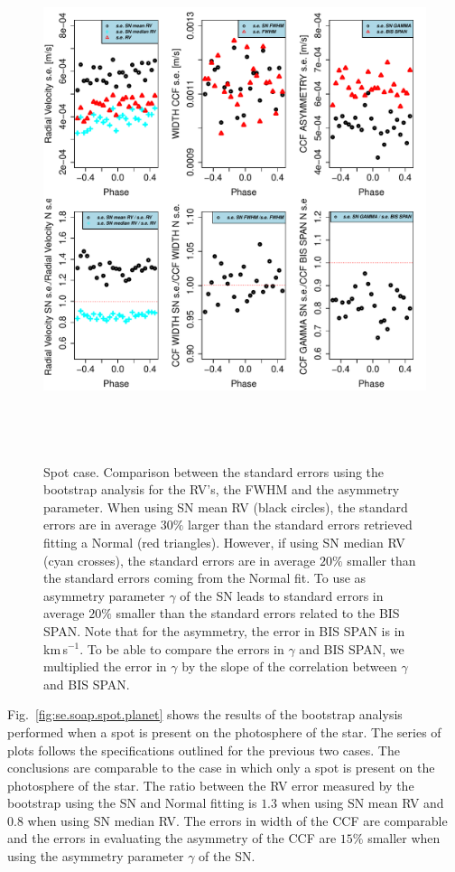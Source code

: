 \documentclass{aa}
\def\kms{\hbox{\,km\,s$^{-1}$}}       %
\begin{document}
\begin{figure}[htbp]
   \centering
\includegraphics[height = 6in]{RV_comparison_SPOT_standard_errors.pdf} 
   \caption{Spot case. Comparison between the standard errors using the bootstrap analysis for the RV's, the FWHM and the asymmetry parameter. When using SN mean RV (black circles), the standard errors are in average $30\%$ larger than the standard errors retrieved fitting a Normal (red triangles). However, if using SN median RV (cyan crosses), the standard errors are in average $20\%$ smaller than the standard errors coming from the Normal fit. To use as asymmetry parameter $\gamma$ of the SN leads to standard errors in average $20\%$ smaller than the standard errors related to the BIS SPAN. Note that for the asymmetry, the error in BIS SPAN is in \kms. To be able to compare the errors in $\gamma$ and BIS SPAN, we multiplied the error in $\gamma$ by the slope of the correlation between $\gamma$ and BIS SPAN.}
   \label{fig:se.soap.spot}
\end{figure}

Fig.~\ref{fig:se.soap.spot.planet} shows the results of the bootstrap analysis performed when a spot is present on the photosphere of the star. The series of plots follows the specifications outlined for the previous two cases. The conclusions are comparable to the case in which only a spot is present on the photosphere of the star. The ratio between the RV error measured by the bootstrap using the SN and Normal fitting is $1.3$ when using SN mean RV and $0.8$ when using SN median RV. The errors in width of the CCF are comparable and the errors in evaluating the asymmetry of the CCF are $15\%$ smaller when using the asymmetry parameter $\gamma$ of the SN.
\end{document}
